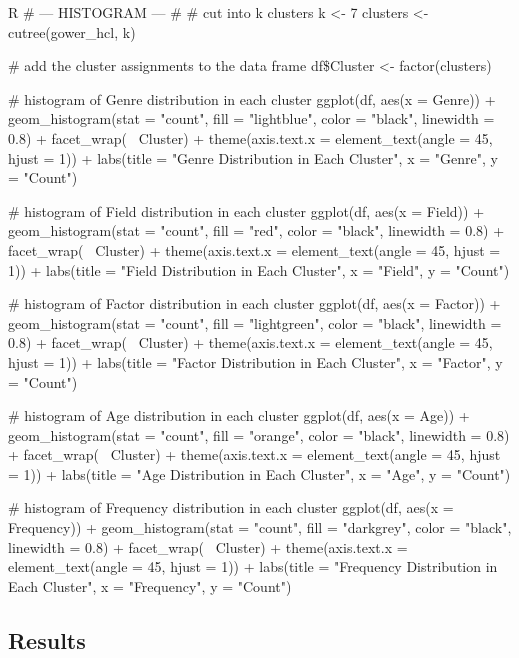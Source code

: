     \begin{code}{R}
            # --- HISTOGRAM --- #
        # cut into k clusters
        k <- 7
        clusters <- cutree(gower_hcl, k)

        # add the cluster assignments to the data frame
        df\$Cluster <- factor(clusters)

        # histogram of Genre distribution in each cluster
        ggplot(df, aes(x = Genre)) +
            geom_histogram(stat = "count", fill = "lightblue", color = "black", linewidth = 0.8) +
            facet_wrap(~ Cluster) +
            theme(axis.text.x = element_text(angle = 45, hjust = 1)) +
            labs(title = "Genre Distribution in Each Cluster", x = "Genre", y = "Count")

        # histogram of Field distribution in each cluster
        ggplot(df, aes(x = Field)) +
            geom_histogram(stat = "count", fill = "red", color = "black", linewidth = 0.8) +
            facet_wrap(~ Cluster) +
            theme(axis.text.x = element_text(angle = 45, hjust = 1)) +
            labs(title = "Field Distribution in Each Cluster", x = "Field", y = "Count")

        # histogram of Factor distribution in each cluster
        ggplot(df, aes(x = Factor)) +
            geom_histogram(stat = "count", fill = "lightgreen", color = "black", linewidth = 0.8) +
            facet_wrap(~ Cluster) +
            theme(axis.text.x = element_text(angle = 45, hjust = 1)) +
            labs(title = "Factor Distribution in Each Cluster", x = "Factor", y = "Count")

        # histogram of Age distribution in each cluster
        ggplot(df, aes(x = Age)) +
            geom_histogram(stat = "count", fill = "orange", color = "black", linewidth = 0.8) +
            facet_wrap(~ Cluster) +
            theme(axis.text.x = element_text(angle = 45, hjust = 1)) +
            labs(title = "Age Distribution in Each Cluster", x = "Age", y = "Count")

        # histogram of Frequency distribution in each cluster
        ggplot(df, aes(x = Frequency)) +
            geom_histogram(stat = "count", fill = "darkgrey", color = "black", linewidth = 0.8) +
            facet_wrap(~ Cluster) +
            theme(axis.text.x = element_text(angle = 45, hjust = 1)) +
            labs(title = "Frequency Distribution in Each Cluster", x = "Frequency", y = "Count")
    \end{code}

\subsection{Results}
